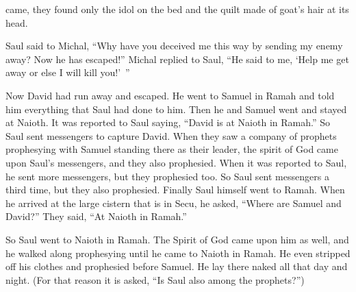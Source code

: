 {came,
they found
only the idol
on
the bed
and the quilt
made of goat’s
hair at its head.
\par }{\PP {}Saul
said
to
Michal,
“Why
have you deceived
me this way
by sending
my enemy
away? Now he has escaped!” Michal
replied
to
Saul,
“He said
to me, ‘Help me get
away or else
I will kill you!’ ”
\par }{\PP {}Now David
had run
away and escaped.
He went
to
Samuel
in Ramah
and told
him everything
that
Saul
had done
to him. Then
he and Samuel
went and stayed
at Naioth.
It was reported
to Saul
saying,
“David
is at Naioth
in Ramah.”
So
Saul
sent
messengers
to capture
David.
When they saw
a company
of prophets
prophesying
with Samuel
standing
there as their leader, the spirit
of God
came upon Saul’s
messengers,
and they also
prophesied.
When it was reported
to Saul,
he sent
more
messengers,
but they prophesied
too.
So Saul
sent
messengers
a third
time, but they
also
prophesied.
Finally
Saul himself
went
to Ramah.
When he arrived
at the large
cistern
that
is in Secu,
he asked,
“Where
are Samuel
and David?” They said,
“At Naioth
in Ramah.”
\par }{\PP {}So Saul went
to
Naioth
in Ramah.
The Spirit
of God
came upon
him as well,
and he walked
along prophesying
until
he came
to Naioth
in Ramah.
He even
stripped
off his clothes
and prophesied
before
Samuel.
He lay
there naked
all
that day
and night.
(For that reason
it is asked,
“Is Saul
also
among the prophets?”)

}
